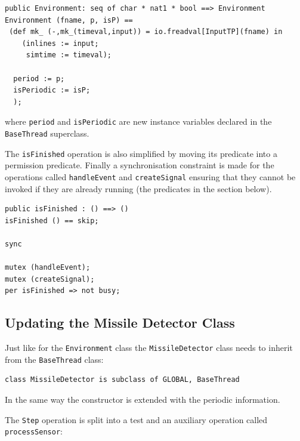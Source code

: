 \documentclass{overturerepchap}
\begin{document}
\begin{lstlisting}
public Environment: seq of char * nat1 * bool ==> Environment
Environment (fname, p, isP) ==
 (def mk_ (-,mk_(timeval,input)) = io.freadval[InputTP](fname) in
    (inlines := input;
     simtime := timeval);
     
  period := p;
  isPeriodic := isP;
  );
\end{lstlisting}
\noindent where \texttt{period} and \texttt{isPeriodic} are new instance
variables declared in the \texttt{BaseThread} superclass.

The \texttt{isFinished} operation is also simplified by moving its
predicate into a permission predicate. Finally a synchronisation
constraint is made for the operations called
\texttt{handleEvent} and \texttt{createSignal}
ensuring that they cannot be invoked if they
are already running (the {\bf{}} predicates in the
{\bf{}} 
section below).

\begin{lstlisting}
public isFinished : () ==> ()
isFinished () == skip;

sync

mutex (handleEvent);
mutex (createSignal);
per isFinished => not busy;
\end{lstlisting}

\subsection{Updating the Missile Detector Class}

Just like for the \texttt{Environment} class the \texttt{MissileDetector} 
class needs to inherit from the \texttt{BaseThread} class:

\begin{lstlisting}
class MissileDetector is subclass of GLOBAL, BaseThread
\end{lstlisting}
\noindent In the same way the constructor is extended with the periodic
information.
%

The \texttt{Step} operation is split into a test and an auxiliary operation
called \texttt{processSensor}:
\end{document}
